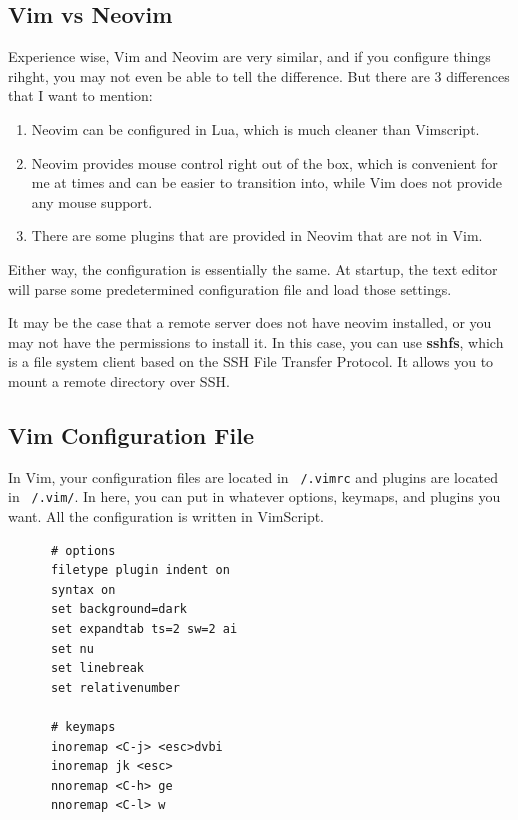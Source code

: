 \documentclass{article}
\begin{document}
  \subsection{Vim vs Neovim}

    Experience wise, Vim and Neovim are very similar, and if you configure things rihght, you may not even be able to tell the difference. But there are 3 differences that I want to mention: 
    
    \begin{enumerate}
      \item Neovim can be configured in Lua, which is much cleaner than Vimscript. 
      \item Neovim provides mouse control right out of the box, which is convenient for me at times and can be easier to transition into, while Vim does not provide any mouse support. 
      \item There are some plugins that are provided in Neovim that are not in Vim. 
    \end{enumerate}

    Either way, the configuration is essentially the same. At startup, the text editor will parse some predetermined configuration file and load those settings. 

    It may be the case that a remote server does not have neovim installed, or you may not have the permissions to install it. In this case, you can use \textbf{sshfs}, which is a file system client based on the SSH File Transfer Protocol. It allows you to mount a remote directory over SSH. 

  \subsection{Vim Configuration File}

    In Vim, your configuration files are located in \texttt{~/.vimrc} and plugins are located in \texttt{~/.vim/}. In here, you can put in whatever options, keymaps, and plugins you want. All the configuration is written in VimScript. 

    \begin{lstlisting} 
      # options 
      filetype plugin indent on 
      syntax on 
      set background=dark
      set expandtab ts=2 sw=2 ai
      set nu
      set linebreak 
      set relativenumber        
      
      # keymaps
      inoremap <C-j> <esc>dvbi
      inoremap jk <esc>
      nnoremap <C-h> ge
      nnoremap <C-l> w 
    \end{lstlisting}
      
\end{document}
